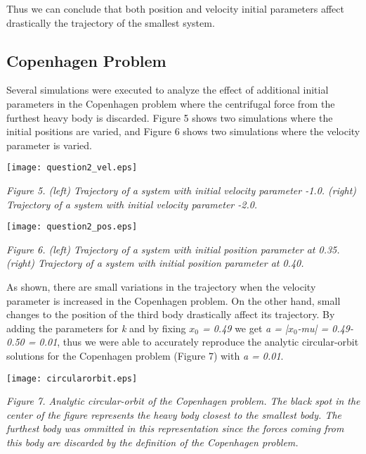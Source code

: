 \documentclass{article}
\begin{document}
Thus we can conclude that both position and velocity initial parameters affect drastically the trajectory of the smallest system.

\subsection{Copenhagen Problem}

Several simulations were executed to analyze the effect of additional initial parameters in the Copenhagen problem where the centrifugal force from the furthest heavy body is discarded. Figure 5 shows two simulations where the initial positions are varied, and Figure 6 shows two simulations where the velocity parameter is varied.

\begin{center}
  \texttt{[image: question2\_vel.eps]}
\end{center}

\begin{center}
   \textit{Figure 5. (left) Trajectory of a system with initial velocity parameter -1.0. (right) Trajectory of a system with initial velocity parameter -2.0.}
\end{center}

\begin{center}
  \texttt{[image: question2\_pos.eps]}
\end{center}

\begin{center}
   \textit{Figure 6. (left) Trajectory of a system with initial position parameter at 0.35. (right) Trajectory of a system with initial position parameter at 0.40.}
\end{center}

As shown, there are small variations in the trajectory when the velocity parameter is increased in the Copenhagen problem. On the other hand, small changes to the position of the third body drastically affect its trajectory. By adding the parameters for \textit{k} and by fixing \textit{$x_0$ = 0.49} we get \textit{a = |$x_0$-mu| = 0.49-0.50 = 0.01}, thus we were able to accurately reproduce the analytic circular-orbit solutions for the Copenhagen problem (Figure 7) with \textit{a = 0.01}.

\begin{center}
  \texttt{[image: circularorbit.eps]}
\end{center}

\begin{center}
   \textit{Figure 7. Analytic circular-orbit of the Copenhagen problem. The black spot in the center of the figure represents the heavy body closest to the smallest body. The furthest body was ommitted in this representation since the forces coming from this body are discarded by the definition of the Copenhagen problem.}
\end{center}
\end{document}
